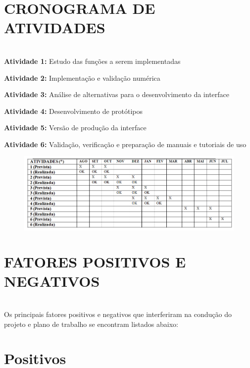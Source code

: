 \documentclass[12pt,letterpaper]{article}
\begin{document}
\newpage

\section*{\centering \textbf{CRONOGRAMA DE ATIVIDADES}}
\hrulefill \\

\textbf{Atividade 1:} Estudo das funções a serem implementadas

\textbf{Atividade 2:} Implementação e validação numérica

\textbf{Atividade 3:} Análise de alternativas para o desenvolvimento da interface

\textbf{Atividade 4:} Desenvolvimento de protótipos

\textbf{Atividade 5:} Versão de produção da interface

\textbf{Atividade 6:} Validação, verificação e preparação de manuais e tutoriais de uso


\begin{figure}[H]
	\begin{center}
		\includegraphics[width=0.95\columnwidth]{cronograma}
	\end{center}
\end{figure}


\newpage

\section*{\centering \textbf{FATORES POSITIVOS E NEGATIVOS}}
\hrulefill \\

Os principais fatores positivos e negativos que interferiram na condução do projeto e plano de trabalho se encontram listados abaixo:

\section{Positivos}
\end{document}
